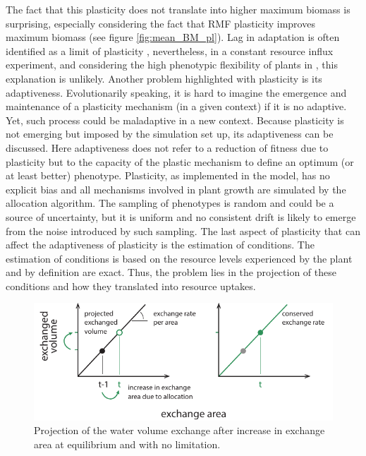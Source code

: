 The fact that this plasticity does not translate into higher maximum biomass is surprising, especially considering the fact that RMF plasticity improves maximum biomass (see figure \ref{fig:mean_BM_pl}). Lag in adaptation is often identified as a limit of plasticity \parencite{dewitt_costs_1998, van_kleunen_constraints_2005}, nevertheless, in a constant resource influx experiment, and considering the high phenotypic flexibility of plants in \model, this explanation is unlikely. Another problem highlighted with plasticity is its adaptiveness. Evolutionarily speaking, it is hard to imagine the emergence and maintenance of a plasticity mechanism (in a given context) if it is no adaptive. Yet, such process could be maladaptive in a new context. Because plasticity is not emerging but imposed by the simulation set up, its adaptiveness can be discussed. Here adaptiveness does not refer to a reduction of fitness due to plasticity but to the capacity of the plastic mechanism to define an optimum (or at least better) phenotype. Plasticity, as implemented in the model, has no explicit bias and all mechanisms involved in plant growth are simulated by the allocation algorithm. The sampling of phenotypes is random and could be a source of uncertainty, but it is uniform and no consistent drift is likely to emerge from the noise introduced by such sampling. The last aspect of plasticity that can affect the adaptiveness of plasticity is the estimation of conditions. The estimation of conditions is based on the resource levels experienced by the plant and by definition are exact. Thus, the problem lies in the projection of these conditions and how they translated into resource uptakes.


\begin{figure}\label{fig:exchange_volume_projection}
\includegraphics[width = \textwidth]{./2_PP/Figures/Concepts/exchange_volume_projection.pdf}
\caption{Projection of the water volume exchange after increase in exchange area at equilibrium and with no limitation.}
\end{figure}

